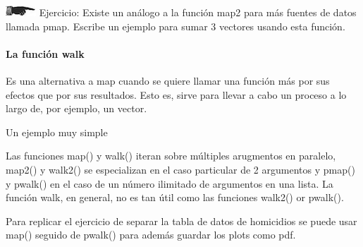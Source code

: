\documentclass[]{book}
\newenvironment{Shaded}{\begin{snugshade}}{\end{snugshade}}
\newcommand{\KeywordTok}[1]{\textcolor[rgb]{0.13,0.29,0.53}{\textbf{#1}}}
\newcommand{\DecValTok}[1]{\textcolor[rgb]{0.00,0.00,0.81}{#1}}
\newcommand{\StringTok}[1]{\textcolor[rgb]{0.31,0.60,0.02}{#1}}
\newcommand{\CommentTok}[1]{\textcolor[rgb]{0.56,0.35,0.01}{\textit{#1}}}
\newcommand{\OperatorTok}[1]{\textcolor[rgb]{0.81,0.36,0.00}{\textbf{#1}}}
\newcommand{\NormalTok}[1]{#1}
\let\oldparagraph\paragraph
\renewcommand{\paragraph}[1]{\oldparagraph{#1}\mbox{}}
\theoremstyle{definition}
\theoremstyle{definition}
\theoremstyle{definition}
\theoremstyle{remark}
\begin{document}
\includegraphics{./imagenes/manicule2.jpg} Ejercicio: Existe un análogo
a la función map2 para más fuentes de datos llamada pmap. Escribe un
ejemplo para sumar 3 vectores usando esta función.

\paragraph{La función walk}\label{la-funcion-walk}

Es una alternativa a map cuando se quiere llamar una función más por sus
efectos que por sus resultados. Esto es, sirve para llevar a cabo un
proceso a lo largo de, por ejemplo, un vector.

Un ejemplo muy simple

\begin{Shaded}
\end{Shaded}

Las funciones map() y walk() iteran sobre múltiples arugmentos en
paralelo, map2() y walk2() se especializan en el caso particular de 2
argumentos y pmap() y pwalk() en el caso de un número ilimitado de
argumentos en una lista. La función walk, en general, no es tan útil
como las funciones walk2() or pwalk().

Para replicar el ejercicio de separar la tabla de datos de homicidios se
puede usar map() seguido de pwalk() para además guardar los plots como
pdf.
\end{document}
